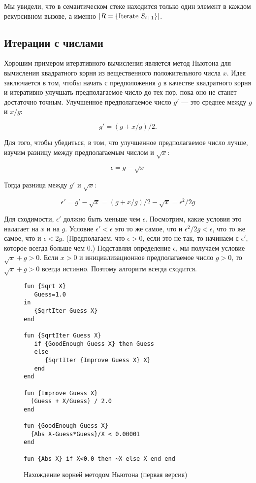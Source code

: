 Мы увидели, что в семантическом стеке находится только один элемент в каждом рекурсивном вызове, а именно $[R=\text{\lstinline|\{|Iterate } S_{i+1} \text{\lstinline|\}|}]$.

\subsection{Итерации с числами}

Хорошим примером итеративного вычисления является метод Ньютона для вычисления квадратного корня из вещественного положительного числа $x$. Идея заключается в том, чтобы начать с предположения $g$ в качестве квадратного корня и итеративно улучшать предполагаемое число до тех пор, пока оно не станет достаточно точным. Улучшенное предполагаемое число $g'$ --- это среднее между $g$ и $x/g$:

$$g' = (g + x/g)/2 \text{.}$$

Для того, чтобы убедиться, в том, что улучшенное предполагаемое число лучше, изучим разницу между предполагаемым числом и $\sqrt{x}$:

$$\epsilon = g - \sqrt{x}$$

Тогда разница между $g'$ и $\sqrt{x}$:

$$\epsilon ' = g' - \sqrt{x} = (g + x/g)/2 - \sqrt{x} = \epsilon^2/2g$$

Для сходимости, $\epsilon '$ должно быть меньше чем $\epsilon$. Посмотрим, какие условия это налагает на $x$ и на $g$. Условие $\epsilon '<\epsilon$ это то же самое, что и $\epsilon^2/2g< \epsilon$, что то же самое, что и $\epsilon<2g$. (Предполагаем, что $\epsilon>0$, если это не так, то начинаем с $\epsilon'$, которое всегда больше чем $0$.) Подставляя определение $\epsilon$, мы получаем условие $\sqrt{x}+g>0$. Если $x>0$ и инициализационное предполагаемое число $g>0$, то $\sqrt{x}+g>0$ всегда истинно. Поэтому алгоритм всегда сходится.

\begin{figure}
\begin{lstlisting}
fun {Sqrt X}
   Guess=1.0
in
   {SqrtIter Guess X}
end

fun {SqrtIter Guess X}
   if {GoodEnough Guess X} then Guess
   else
      {SqrtIter {Improve Guess X} X}
   end
end

fun {Improve Guess X}
  (Guess + X/Guess) / 2.0
end

fun {GoodEnough Guess X}
  {Abs X-Guess*Guess}/X < 0.00001
end

fun {Abs X} if X<0.0 then ~X else X end end
\end{lstlisting}
\caption{Нахождение корней методом Ньютона (первая версия)}
\label{figure:Newton_method_I}
\end{figure}

